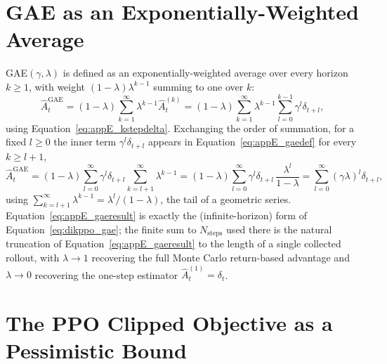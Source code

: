 \section{GAE as an Exponentially-Weighted Average}\label{sec:appE_gae}

GAE$(\gamma,\lambda)$ is defined as an exponentially-weighted average over every horizon $k \geq 1$,
with weight $(1-\lambda)\lambda^{k-1}$ summing to one over $k$:
\begin{equation}
\hat{A}_t^{\text{GAE}} = (1-\lambda)\sum_{k=1}^{\infty}\lambda^{k-1}\hat{A}_t^{(k)}
= (1-\lambda)\sum_{k=1}^{\infty}\lambda^{k-1}\sum_{l=0}^{k-1}\gamma^l\delta_{t+l},
\label{eq:appE_gaedef}
\end{equation}
using Equation~\eqref{eq:appE_kstepdelta}. Exchanging the order of summation, for a fixed $l \geq 0$
the inner term $\gamma^l\delta_{t+l}$ appears in Equation~\eqref{eq:appE_gaedef} for every $k \geq
l+1$,
\begin{equation}
\hat{A}_t^{\text{GAE}} = (1-\lambda)\sum_{l=0}^{\infty}\gamma^l\delta_{t+l}\sum_{k=l+1}^{\infty}\lambda^{k-1}
= (1-\lambda)\sum_{l=0}^{\infty}\gamma^l\delta_{t+l}\,\frac{\lambda^l}{1-\lambda}
= \sum_{l=0}^{\infty}(\gamma\lambda)^l\delta_{t+l},
\label{eq:appE_gaeresult}
\end{equation}
using $\sum_{k=l+1}^{\infty}\lambda^{k-1} = \lambda^l/(1-\lambda)$, the tail of a geometric series.
Equation~\eqref{eq:appE_gaeresult} is exactly the (infinite-horizon) form of
Equation~\eqref{eq:dikppo_gae}; the finite sum to $N_{\text{steps}}$ used there is the natural
truncation of Equation~\eqref{eq:appE_gaeresult} to the length of a single collected rollout, with
$\lambda \to 1$ recovering the full Monte Carlo return-based advantage and $\lambda \to 0$ recovering
the one-step estimator $\hat A_t^{(1)} = \delta_t$.

\section{The PPO Clipped Objective as a Pessimistic Bound}\label{sec:appE_clip}

